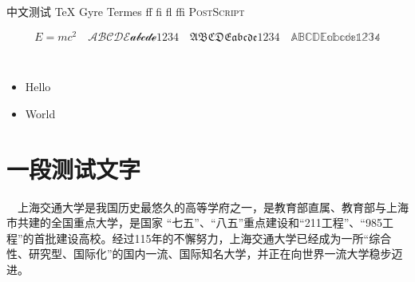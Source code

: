 \documentclass[12pt,a4paper,UTF8,adobefonts]{ctexbook}
\begin{document}
中文测试 TeX Gyre Termes ff fi fl ffi \textsc{PostScript} %

\begin{displaymath}
  E=mc^2 \quad \mathscr{ABCDE abcde 1234} \quad \mathfrak{ABCDE abcde 1234} \quad \mathbb{ABCDE abcde 1234}
\end{displaymath}

\begin{figure}
  \centering
  \hspace{1in}
  \\ %
  \hspace{1in}
\end{figure}

\begin{itemize}
\item Hello
\item World
\end{itemize}

\section{一段测试文字}

 　上海交通大学是我国历史最悠久的高等学府之一，是教育部直属、教育部与上海市共建的全国重点大学，是国家 “七五”、“八五”重点建设和“211工程”、“985工程”的首批建设高校。经过115年的不懈努力，上海交通大学已经成为一所“综合性、研究型、国际化”的国内一流、国际知名大学，并正在向世界一流大学稳步迈进。 
\end{document}
